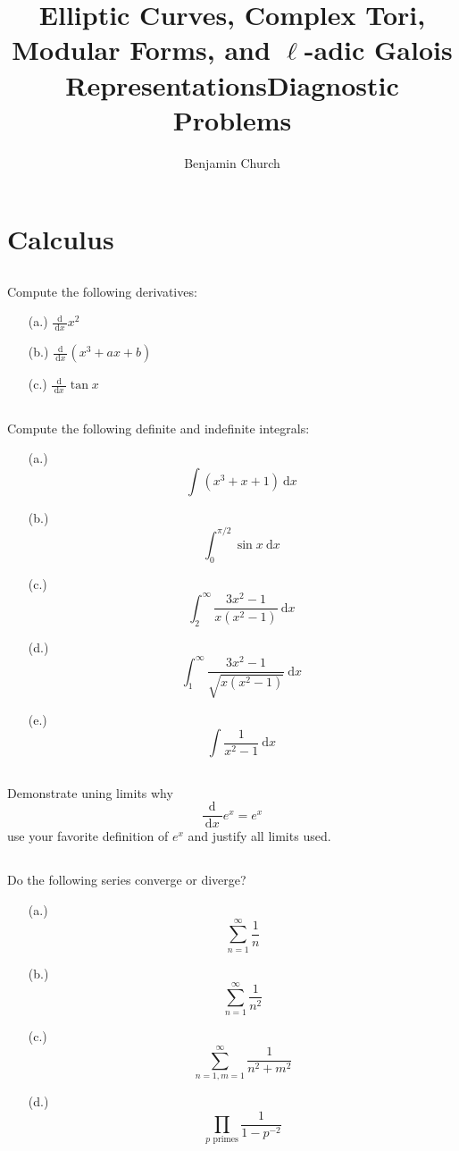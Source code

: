 \documentclass{article}
\title{Elliptic Curves, Complex Tori, Modular Forms, and $\ell$-adic Galois Representations}
\author{Benjamin Church}
\renewcommand{\d}[1]{\: \mathrm{d}#1 \:}
\newcommand{\deriv}[2]{\frac{\d{#1}}{\d{#2}}}
\theoremstyle{definition}
\begin{document}
\title{Diagnostic Problems}

\section{Calculus}


\subsection{}

Compute the following derivatives:

\begin{enumerate}
\item[(a.)] $\deriv{}{x} x^2$
\item[(b.)] $\deriv{}{x} (x^3 + a x + b)$
\item[(c.)] $\deriv{}{x} \tan{x}$
\end{enumerate}

\subsection{}

Compute the following definite and indefinite integrals:

\begin{enumerate}
\item[(a.)] \[ \int (x^3 + x + 1) \d{x} \]
\item[(b.)] \[ \int_0^{\pi/2} \sin{x} \d{x} \]
\item[(c.)] \[ \int_2^{\infty} \frac{3 x^2 - 1}{x(x^2 - 1)} \d{x}  \]
\item[(d.)] \[ \int_1^{\infty} \frac{3 x^2 - 1}{\sqrt{x(x^2 - 1)}} \d{x}  \]
\item[(e.)] \[ \int \frac{1}{x^2 - 1} \d{x} \]
\end{enumerate}

\subsection{}

Demonstrate uning limits why
\[ \deriv{}{x} e^x = e^x \]
use your favorite definition of $e^x$ and justify all limits used. 

\subsection{}

Do the following series converge or diverge?

\begin{enumerate}
\item[(a.)] \[ \sum_{n = 1}^\infty \frac{1}{n} \]
\item[(b.)] \[ \sum_{n = 1}^\infty \frac{1}{n^2} \]
\item[(c.)] \[ \sum_{n = 1, m = 1}^\infty \frac{1}{n^2 + m^2} \]
\item[(d.)] \[ \prod_{p \text{ primes}} \frac{1}{1 - p^{-2}} \]
\end{enumerate}
\end{document}
